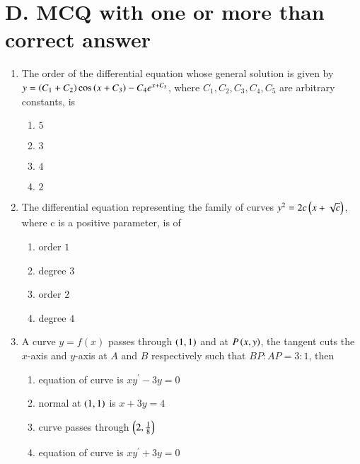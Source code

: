 \documentclass[journal,12pt,twocolumn]{IEEEtran}
\theoremstyle{remark}
\begin{document}
\section*{D. MCQ with one or more than correct answer}
\begin{enumerate}
    
\item The order of the differential equation whose general solution is given by
$y = \left(C_1 + C_2\right) \cos \left(x + C_3\right) - C_4 e^{x+C_5}$, where $C_1, C_2, C_3, C_4, C_5$ are arbitrary constants, is \hfill {}

\begin{multicols}{2}
\begin{enumerate}
    \item $5$
    \item $3$ 
    \item $4$
    \item $2$ 
\end{enumerate} 
\end{multicols}

\item  The differential equation representing the family of curves
$y^2 = 2c \left(x + \sqrt{c}\right)$, where c  is a positive parameter, is of \hfill {}

\begin{multicols}{2}
\begin{enumerate}
    \item order $1$ 
    \item degree $3$
    \item order $2$
    \item degree $4$
\end{enumerate}
\end{multicols}

\item  A curve $ y = f(x) $ passes through $ \left(1,1\right) $ and at $ P\left(x, y\right) $, the tangent cuts the $ x $-axis and $ y $-axis at $ A $ and $ B $ respectively such that $ BP : AP = 3 : 1 $, then \hfill {}
\begin{enumerate}
    \item equation of curve is $ xy^\prime - 3y = 0 $
    \item normal at $ \left(1, 1\right) $ is $ x + 3y = 4 $
    \item curve passes through $ \left(2, \frac{1}{8}\right) $
    \item equation of curve is $xy^\prime + 3y = 0 $
\end{enumerate}


\end{enumerate}
\end{document}
